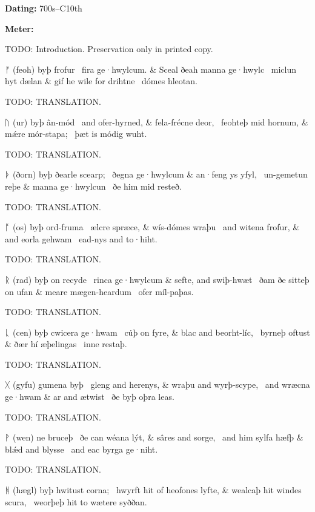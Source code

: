\begin{flushright}%
\textbf{Dating:} 700s–C10th%

\textbf{Meter:} \Fornyrdislag%
\end{flushright}%

TODO: Introduction.  Preservation only in printed copy.

\sectionline


\bvg\bva%
ᚠ (feoh) byþ frofur \hld\ fira ge·hwylcum. &
Sceal ðeah manna ge·hwylc \hld\ miclun hyt dælan &
gif he wile for drihtne \hld\ dómes hleotan.\eva

\bvb TODO: TRANSLATION.\evb\evg


\bvg\bva%
ᚢ (ur) byþ ân-mód \hld\ and ofer-hyrned, &
fela-frécne deor, \hld\ feohteþ mid hornum, &
mǽre mór-stapa; \hld\ þæt is módig wuht.\eva

\bvb TODO: TRANSLATION.\evb\evg


\bvg\bva%
ᚦ (ðorn) byþ ðearle scearp; \hld\ ðegna ge·hwylcum &
an·feng ys yfyl, \hld\ un-gemetun reþe &
manna ge·hwylcun \hld\ ðe him mid resteð.\eva

\bvb TODO: TRANSLATION.\evb\evg


\bvg\bva%
ᚩ (os) byþ ord-fruma \hld\ ælcre spræce, &
wís-dómes wraþu \hld\ and witena frofur, &
and eorla gehwam \hld\ ead-nys and to·hiht.\eva

\bvb TODO: TRANSLATION.\evb\evg


\bvg\bva%
ᚱ (rad) byþ on recyde \hld\ rinca ge·hwylcum &
sefte, and swiþ-hwæt \hld\ ðam ðe sitteþ on ufan &
meare mægen-heardum \hld\ ofer míl-paþas.\eva

\bvb TODO: TRANSLATION.\evb\evg


\bvg\bva%
ᚳ (cen) byþ cwicera ge·hwam \hld\ cu̇þ on fyre, &
blac and beorht-líc, \hld\ byrneþ oftust &
ðær hí æþelingas \hld\ inne restaþ.\eva

\bvb TODO: TRANSLATION.\evb\evg


\bvg\bva%
ᚷ (gyfu) gumena byþ \hld\ gleng and herenys, &
wraþu and wyrþ-scype, \hld\ and wræcna ge·hwam &
ar and ætwist \hld\ ðe byþ oþra leas.\eva

\bvb TODO: TRANSLATION.\evb\evg


\bvg\bva%
ᚹ (wen) ne bruceþ \hld\ ðe can wéana lýt, &
sâres and sorge, \hld\ and him sylfa hæfþ &
blǽd and blysse \hld\ and eac byrga ge·niht.\eva

\bvb TODO: TRANSLATION.\evb\evg


\bvg\bva%
ᚻ (hægl) byþ hwitust corna; \hld\ hwyrft hit of heofones lyfte, &
wealcaþ hit windes scura, \hld\ weorþeþ hit to wætere syððan.\eva

